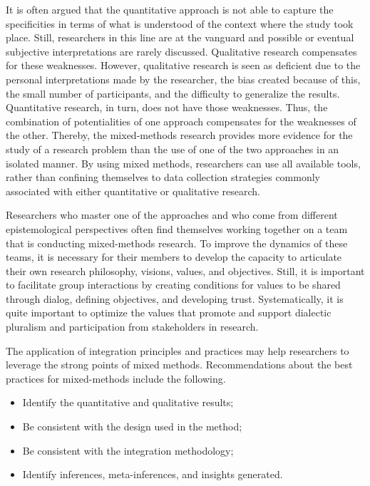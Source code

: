 It is often argued that the quantitative approach is not able to capture the specificities in terms of what is understood of the context where the study took place. Still, researchers in this line are at the vanguard and possible or eventual subjective interpretations are rarely discussed. Qualitative research compensates for these weaknesses. However, qualitative research is seen as deficient due to the personal interpretations made by the researcher, the bias created because of this, the small number of participants, and the difficulty to generalize the results. Quantitative research, in turn, does not have those weaknesses. Thus, the combination of potentialities of one approach compensates for the weaknesses of the other. Thereby, the mixed-methods research provides more evidence for the study of a research problem than the use of one of the two approaches in an isolated manner. By using mixed methods, researchers can use all available tools, rather  than confining themselves to data collection strategies commonly associated with either quantitative or qualitative research. 

Researchers who master one of the approaches and who come from different epistemological perspectives often find themselves working together on a team that is conducting mixed-methods research. To improve the dynamics of these teams, it is necessary for their members to develop the capacity to articulate their own research philosophy, visions, values, and objectives. Still, it is important to facilitate group interactions by creating conditions for values to be shared through dialog, defining objectives, and developing trust. Systematically, it is quite important to optimize the values that promote and support dialectic pluralism and participation from stakeholders in research.

The application of integration principles and practices may help researchers to leverage the strong points of mixed methods. Recommendations about the best practices for mixed-methods include the following.

\begin{itemize}
	
	\item Identify the quantitative and qualitative results;

	\item Be consistent with the design used in the method;

	\item Be consistent with the integration methodology;

	\item Identify inferences, meta-inferences, and insights generated.

\end{itemize}

